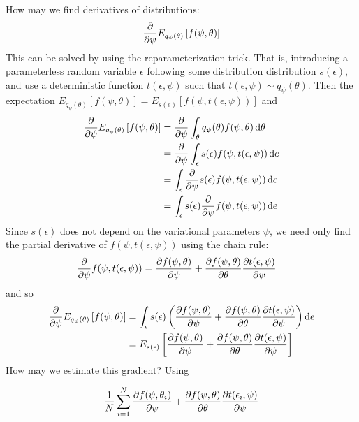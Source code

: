 How may we find derivatives of distributions:
\begin{align*}
    \pdv{\psi} E_{q_\psi(\theta)}\left[ f(\psi, \theta) \right]
\end{align*}
This can be solved by using the reparameterization trick.
That is, introducing a parameterless random variable $\epsilon$ following some distribution distribution $s(\epsilon)$, and use a deterministic function $t(\epsilon, \psi)$ such that $t(\epsilon, \psi) \sim q_\psi(\theta)$.
Then the expectation 
$ E_{q_\psi(\theta)}\left[ f(\psi, \theta) \right] =E_{s(e)}\left[ f(\psi, t(\epsilon, \psi)) \right]$ and 
\begin{align*}
    \pdv{\psi} E_{q_\psi(\theta)}\left[ f(\psi, \theta) \right] 
    &= \pdv{\psi} \int_\theta q_\psi(\theta) f(\psi, \theta)\dd{\theta}\\
    &= \pdv{\psi} \int_\epsilon s(\epsilon) f(\psi, t(\epsilon, \psi))\dd{e}\\
    &= \int_\epsilon \pdv{\psi} s(\epsilon) f(\psi, t(\epsilon, \psi))\dd{e}\\
    &= \int_\epsilon s(\epsilon) \pdv{\psi} f(\psi, t(\epsilon, \psi)) \dd{e}
\end{align*}
Since $s(\epsilon)$ does not depend on the variational parameters $\psi$, we need only find the partial derivative of $f(\psi, t(\epsilon, \psi))$ using the chain rule:
\begin{align*}
    \pdv{\psi} f(\psi, t(\epsilon, \psi)) 
    &= \pdv{f(\psi, \theta)}{\psi}
    + \pdv{f(\psi, \theta)}{\theta}\pdv{t(\epsilon, \psi)}{\psi} 
\end{align*}
and so 
\begin{align*}
    \pdv{\psi} E_{q_\psi(\theta)}\left[ f(\psi, \theta) \right] 
    &= \int_\epsilon s(\epsilon) \left(\pdv{f(\psi, \theta)}{\psi}
    + \pdv{f(\psi, \theta)}{\theta}\pdv{t(\epsilon, \psi)}{\psi} \right) \dd{e} \\
    &= E_{s(\epsilon)} \left[\pdv{f(\psi, \theta)}{\psi} 
    + \pdv{f(\psi, \theta)}{\theta}\pdv{t(\epsilon, \psi)}{\psi} \right]
\end{align*}
How may we estimate this gradient?  Using 

\begin{align*}
    \frac{1}{N} \sum_{i=1}^N \pdv{f(\psi, \theta_i)}{\psi} 
    + \pdv{f(\psi, \theta)}{\theta}\pdv{t(\epsilon_i, \psi)}{\psi} 
\end{align*}
